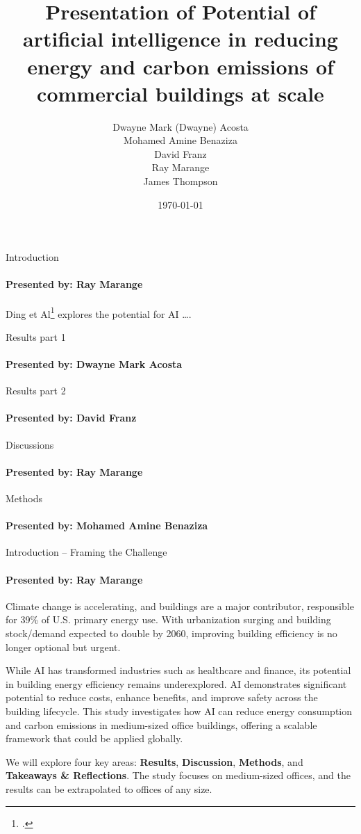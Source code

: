\documentclass{beamer}
\title{Presentation of Potential of artificial intelligence in reducing energy and carbon emissions of commercial buildings at scale}
\author{Dwayne Mark (Dwayne) Acosta \\ Mohamed Amine Benaziza \\ David Franz \\ Ray Marange \\ James Thompson}
\date{\today}
\begin{document}
\frame{\titlepage}

\begin{frame}{Introduction}
\framesubtitle{Presented by: Ray Marange}
Ding et Al\footcite{dingPotentialArtificialIntelligence2024} explores the potential for AI \dots.

\end{frame}

\begin{frame}{Results part 1}
\framesubtitle{Presented by: Dwayne Mark Acosta}

\end{frame}

\begin{frame}{Results part 2}
\framesubtitle{Presented by: David Franz}


\end{frame}

\begin{frame}{Discussions}
\framesubtitle{Presented by: Ray Marange}

\end{frame}

\begin{frame}{Methods}
\framesubtitle{Presented by: Mohamed Amine Benaziza}

\end{frame}
\begin{frame}{Introduction – Framing the Challenge}
\framesubtitle{Presented by: Ray Marange}
Climate change is accelerating, and buildings are a major contributor, responsible for 39\% of U.S. primary energy use. With urbanization surging and building stock/demand expected to double by 2060, improving building efficiency is no longer optional but urgent.

While AI has transformed industries such as healthcare and finance, its potential in building energy efficiency remains underexplored. AI demonstrates significant potential to reduce costs, enhance benefits, and improve safety across the building lifecycle. This study investigates how AI can reduce energy consumption and carbon emissions in medium-sized office buildings, offering a scalable framework that could be applied globally.

We will explore four key areas: \textbf{Results}, \textbf{Discussion}, \textbf{Methods}, and \textbf{Takeaways \& Reflections}. The study focuses on medium-sized offices, and the results can be extrapolated to offices of any size.
\end{frame}
\end{document}
